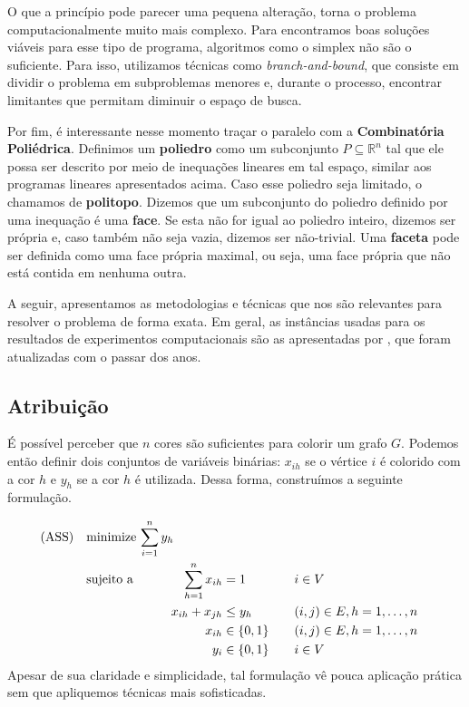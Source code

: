\documentclass[11pt]{article}
\begin{document}
O que a princípio pode parecer uma pequena alteração, torna o problema computacionalmente muito mais complexo.
Para encontramos boas soluções viáveis para esse tipo de programa, algoritmos como o simplex não são o suficiente.
Para isso, utilizamos técnicas como \emph{branch-and-bound}, que consiste em dividir o problema em subproblemas menores e, durante o processo, encontrar limitantes que permitam diminuir o espaço de busca.

Por fim, é interessante nesse momento traçar o paralelo com a \textbf{Combinatória Poliédrica}.
Definimos um \textbf{poliedro} como um subconjunto \(P \subseteq \mathbb{R}^n\) tal que ele possa ser descrito por meio de inequações lineares em tal espaço, similar aos programas lineares apresentados acima.
Caso esse poliedro seja limitado, o chamamos de \textbf{politopo}.
Dizemos que um subconjunto do poliedro definido por uma inequação é uma \textbf{face}.
Se esta não for igual ao poliedro inteiro, dizemos ser própria e, caso também não seja vazia, dizemos ser não-trivial.
Uma \textbf{faceta} pode ser definida como uma face própria maximal, ou seja, uma face própria que não está contida em nenhuma outra.

A seguir, apresentamos as metodologias e técnicas que nos são relevantes para resolver o problema de forma exata.
Em geral, as instâncias usadas para os resultados de experimentos computacionais são as apresentadas por \textcite{DIMACSGraphColoringInstances}, que foram atualizadas com o passar dos anos.

\subsection{Atribuição}
\label{sec:org104c1cf}
É possível perceber que \(n\) cores são suficientes para colorir um grafo \(G\). Podemos então definir dois conjuntos de variáveis binárias: \(x_{ih}\) se o vértice \(i\) é colorido com a cor \(h\) e \(y_h\) se a cor \(h\) é utilizada. Dessa forma, construímos a seguinte formulação.

\begin{alignat*}{4}
\label{ass}
\mathrm{(ASS)} \quad & \omit\rlap{minimize  $\displaystyle \sum_{i=1}^n y_h$} \\
& \mbox{sujeito a}&& \quad & \sum_{h=1}^n x_{ih}&= 1        & \quad & i \in V \\
&                 &&   & x_{ih} + x_{jh}    & \leq y_h &   & (i,j) \in E, h=1,\dots,n \\
&                 &&   & x_{ih}    & \in \{0,1\} &   & (i,j) \in E, h=1,\dots,n\\
&                 &&   & y_i       & \in \{0,1\} &   & i \in V
\end{alignat*}
Apesar de sua claridade e simplicidade, tal formulação vê pouca aplicação prática sem que apliquemos técnicas mais sofisticadas.
\end{document}
